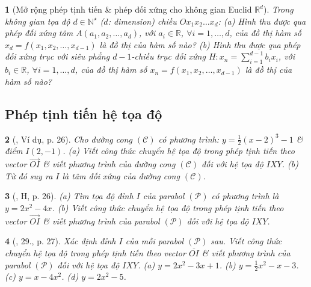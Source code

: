 \documentclass{article}
\newtheorem{baitoan}{}
\begin{document}
\begin{baitoan}[Mở rộng phép tịnh tiến \& phép đối xứng cho không gian Euclid $\mathbb{R}^d$]
	Trong không gian tọa độ $d\in\mathbb{N}^\star$ ($d$: dimension) chiều $Ox_1x_2\ldots x_d$: (a) Hình thu được qua phép đối xứng tâm $A(a_1,a_2,\ldots,a_d)$, với $a_i\in\mathbb{R}$, $\forall i = 1,\ldots,d$, của đồ thị hàm số $x_d = f(x_1,x_2,\ldots,x_{d-1})$ là đồ thị của hàm số nào? (b) Hình thu được qua phép đối xứng trục với siêu phẳng $d - 1$-chiều trục đối xứng $H:x_n = \sum_{i=1}^{d-1} b_ix_i$, với $b_i\in\mathbb{R}$, $\forall i = 1,\ldots,d$, của đồ thị hàm số $x_n = f(x_1,x_2,\ldots,x_{d-1})$ là đồ thị của hàm số nào?
\end{baitoan}

\subsection{Phép tịnh tiến hệ tọa độ}

\begin{baitoan}[\cite{SGK_Toan_12_giai_tich_nang_cao}, Ví dụ, p. 26]
	Cho đường cong $(\mathcal{C})$ có phương trình: $y = \frac{1}{2}(x - 2)^3 - 1$ \& điểm $I(2,-1)$. (a) Viết công thức chuyển hệ tọa độ trong phép tịnh tiến theo vector $\overrightarrow{OI}$ \& viết phương trình của đường cong $(\mathcal{C})$ đối với hệ tọa độ $IXY$. (b) Từ đó suy ra $I$ là tâm đối xứng của đường cong $(\mathcal{C})$.
\end{baitoan}

\begin{baitoan}[\cite{SGK_Toan_12_giai_tich_nang_cao}, H, p. 26]
	(a) Tìm tọa độ đỉnh $I$ của parabol $(\mathcal{P})$ có phương trình là $y = 2x^2 - 4x$. (b) Viết công thức chuyển hệ tọa độ trong phép tịnh tiến theo vector $\overrightarrow{OI}$ \& viết phương trình của parabol $(\mathcal{P})$ đối với hệ tọa độ $IXY$.
\end{baitoan}

\begin{baitoan}[\cite{SGK_Toan_12_giai_tich_nang_cao}, 29., p. 27]
	Xác định đỉnh $I$ của mỗi parabol $(\mathcal{P})$ sau. Viết công thức chuyển hệ tọa độ trong phép tịnh tiến theo vector $\overline{OI}$ \& viết phương trình của parabol $(\mathcal{P})$ đối với hệ tọa độ $IXY$. (a) $y = 2x^2 - 3x + 1$. (b) $y = \frac{1}{2}x^2 - x - 3$. (c) $y = x - 4x^2$. (d) $y = 2x^2 - 5$.
\end{baitoan}
\end{document}
